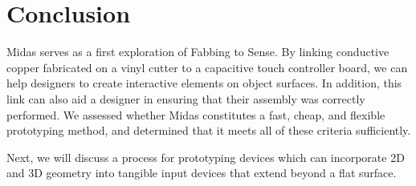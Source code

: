 \section{Conclusion}

Midas serves as a first exploration of Fabbing to Sense. By linking conductive copper fabricated on a vinyl cutter to a capacitive touch controller board, we can help designers to create interactive elements on object surfaces. In addition, this link can also aid a designer in ensuring that their assembly was correctly performed. We assessed whether Midas constitutes a fast, cheap, and flexible prototyping method, and determined that it meets all of these criteria sufficiently.

Next, we will discuss a process for prototyping devices which can incorporate 2D and 3D geometry into tangible input devices that extend beyond a flat surface.